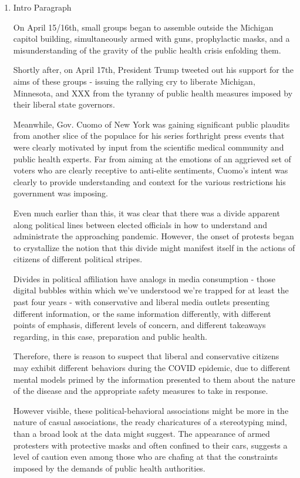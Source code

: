 \documentclass{article}
\begin{document}
\begin{enumerate}
	\item Intro Paragraph
	
	On April 15/16th, small groups began to assemble outside the Michigan capitol building, simultaneously armed with guns, prophylactic masks, and a misunderstanding of the gravity of the public health crisis enfolding them. 
	
	Shortly after, on April 17th, President Trump tweeted out his support for the aims of these groups - issuing the rallying cry to liberate Michigan, Minnesota, and XXX from the tyranny of public health measures imposed by their liberal state governors. 
	
	Meanwhile, Gov. Cuomo of New York was gaining significant public plaudits from another slice of the populace for his series forthright press events that were clearly motivated by input from the scientific medical community and public health experts. Far from aiming at the emotions of an aggrieved 
	set of voters who are clearly receptive to anti-elite sentiments, Cuomo's intent was clearly to provide understanding and context for the various restrictions his government was imposing. 
	
	Even much earlier than this, it was clear that there was a divide apparent along political lines between elected officials in how to understand and administrate the approaching pandemic. However, the onset of protests began to crystallize the notion that this divide might manifest itself in the actions of citizens of different political stripes. 
	
	Divides in political affiliation have analogs in media consumption - those digital bubbles within which we've understood we're trapped for at least the past four years - with conservative and liberal media outlets presenting different information, or the same information differently, with different points of emphasis, different levels of concern, and different takeaways regarding, in this case, preparation and public health. 
	
	Therefore, there is reason to suspect that liberal and conservative citizens may exhibit different behaviors during the COVID epidemic, due to different mental models primed by the information presented to them about the nature of the disease and the appropriate safety measures to take in response. 
	
	However visible, these political-behavioral associations might be more in the nature of casual associations, the ready charicatures of a stereotyping mind, than a broad look at the data might suggest. The appearance of armed protesters with protective masks and often confined to their cars, suggests a level of caution even among those who are chafing at that the constraints imposed by the demands of public health authorities. 
	

\end{enumerate}
\end{document}
